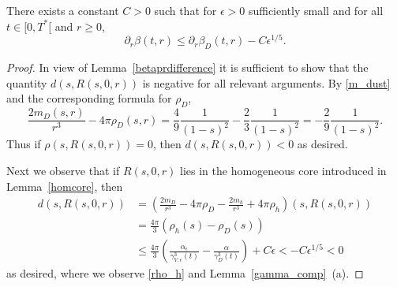 \documentclass[11pt]{article}
\begin{document}
\begin{lemma}\label{iback}
  There exists a constant $C>0$ such that for $\epsilon>0$ sufficiently small
  and for all $t\in [0,T^\ast[$ and $r\geq 0$,
  \[
  \partial_r\beta(t,r)\leq\partial_r\beta_D(t,r) - C \epsilon^{1/5}.
  \]
\end{lemma}
%
\begin{proof}
  In view of Lemma~\ref{betaprdifference}
  it is sufficient to show that the quantity
  $d(s,R(s,0,r))$ is negative for all relevant arguments. By \eqref{m_dust} and
  the corresponding formula for $\rho_D$,
  \[
  \frac{2 m_D(s,r)}{r^3} - 4\pi \rho_D(s,r) = \frac{4}{9}\frac{1}{(1-s)^2} -
  \frac{2}{3}\frac{1}{(1-s)^2} = -  \frac{2}{9}\frac{1}{(1-s)^2}.
  \]
  Thus if $\rho(s,R(s,0,r))=0$, then $d(s,R(s,0,r)) < 0$ as desired.

  Next we observe that if $R(s,0,r)$ lies in the homogeneous core introduced
  in Lemma~\ref{homcore}, then
  \begin{align*}
    d(s,R(s,0,r))
    &=
    \left(\frac{2 m_D}{r^3} - 4\pi \rho_D
    - \frac{2 m_h}{r^3} + 4\pi \rho_h\right)
    (s,R(s,0,r))\\
    &= \frac{4\pi}{3}
    \left(\rho_h(s) - \rho_D(s) \right)\\
    &\leq
    \frac{4\pi}{3}
    \left(\frac{\alpha_\epsilon}{\gamma^3_{V,\epsilon}(t)}
    - \frac{\alpha}{\gamma^3_{D}(t)}\right)+ C \epsilon
    <-C \epsilon^{1/5} < 0
  \end{align*}
  as desired, where we observe \eqref{rho_h} and Lemma~\ref{gamma_comp}~(a).


\end{proof}
\end{document}
